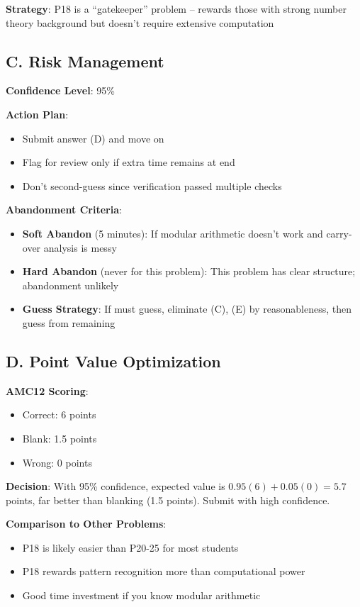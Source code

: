 \documentclass[]{article}
\begin{document}
\begin{competitionbox}
\textbf{Strategy}: P18 is a ``gatekeeper'' problem -- rewards those with strong number theory background but doesn't require extensive computation

\subsection*{C. Risk Management}

\textbf{Confidence Level}: 95\%

\textbf{Action Plan}:
\begin{itemize}
    \item Submit answer (D) and move on
    \item Flag for review only if extra time remains at end
    \item Don't second-guess since verification passed multiple checks
\end{itemize}

\textbf{Abandonment Criteria}:
\begin{itemize}
    \item \textbf{Soft Abandon} (5 minutes): If modular arithmetic doesn't work and carry-over analysis is messy
    \item \textbf{Hard Abandon} (never for this problem): This problem has clear structure; abandonment unlikely
    \item \textbf{Guess Strategy}: If must guess, eliminate (C), (E) by reasonableness, then guess from remaining
\end{itemize}

\subsection*{D. Point Value Optimization}

\textbf{AMC12 Scoring}:
\begin{itemize}
    \item Correct: 6 points
    \item Blank: 1.5 points
    \item Wrong: 0 points
\end{itemize}

\textbf{Decision}: With 95\% confidence, expected value is $0.95(6) + 0.05(0) = 5.7$ points, far better than blanking (1.5 points). Submit with high confidence.

\textbf{Comparison to Other Problems}:
\begin{itemize}
    \item P18 is likely easier than P20-25 for most students
    \item P18 rewards pattern recognition more than computational power
    \item Good time investment if you know modular arithmetic
\end{itemize}
\end{competitionbox}
\end{document}
